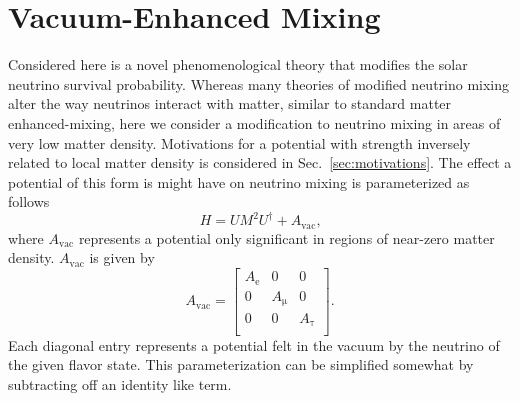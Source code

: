 \chapter{Vacuum-Enhanced Mixing}
\label{sec:chameleons}

\ifpdf
    \graphicspath{{chameleons}{chameleons/figures/PDF/}{chameleons/figures/}}
\else
    \graphicspath{{chameleons/figures/EPS/}{chameleons/figures/}}
\fi

Considered here is a novel phenomenological theory that modifies the solar
neutrino survival probability.
Whereas many theories of modified neutrino mixing alter the way neutrinos
interact with matter, similar to standard matter enhanced-mixing,
here we consider a modification to neutrino mixing in areas of very low matter
density.
 Motivations for a potential with strength inversely related to local matter
density is considered in Sec.~\ref{sec:motivations}.
The effect a potential of this form is might have on neutrino
mixing is parameterized as follows
\begin{equation}
H = UM^{2}U^{\dagger} + A_{\mathrm{vac}}\text{,}
\end{equation}
where $A_{\mathrm{vac}}$ represents a potential only significant in regions
of near-zero matter density.
$A_{\mathrm{vac}}$ is given by
\begin{equation}
A_{\mathrm{vac}} =
\begin{bmatrix}
    A_{\mathrm{e}} & 0 & 0  \\
    0 &  A_{\mathrm{\mu}} & 0  \\
    0 & 0 &  A_{\mathrm{\tau}}  \\
\end{bmatrix}\text{.}
\end{equation}
Each diagonal entry represents a potential felt in the vacuum
by the neutrino of the given flavor state.
This parameterization can be simplified somewhat by subtracting off
an identity like term.
